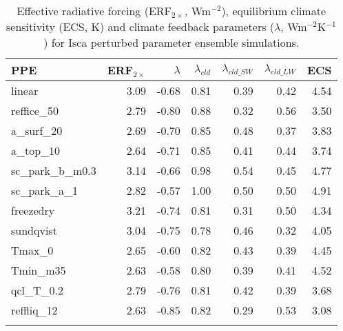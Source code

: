  \begin{table}[ht]
	\caption{Effective radiative forcing (ERF$_{2\times}$, Wm$^{-2}$), equilibrium climate sensitivity (ECS, K) and climate feedback parameters ($\lambda$, Wm$^{-2}$K$^{-1}$) for Isca perturbed parameter ensemble simulations.}
	\centering
	\small
	\vspace{2em}
	\renewcommand{\arraystretch}{1.2}
    \begin{tabular}{lrrrrrr}
    \toprule
    {PPE} &  ERF$_{2\times}$ &  $\lambda$ &  $\lambda_{cld}$ &  $\lambda_{cld\_SW}$ &  $\lambda_{cld\_LW}$ &  ECS \\
    \midrule
    linear         &    3.09 &   -0.68 &        0.81 &           0.39 &           0.42 & 4.54 \\
    reffice\_50     &    2.79 &   -0.80 &        0.88 &           0.32 &           0.56 & 3.50 \\
    a\_surf\_20      &    2.69 &   -0.70 &        0.85 &           0.48 &           0.37 & 3.83 \\
    a\_top\_10       &    2.64 &   -0.71 &        0.85 &           0.41 &           0.44 & 3.74 \\
    sc\_park\_b\_m0.3 &    3.14 &   -0.66 &        0.98 &           0.54 &           0.45 & 4.77 \\
    sc\_park\_a\_1    &    2.82 &   -0.57 &        1.00 &           0.50 &           0.50 & 4.91 \\
    freezedry      &    3.21 &   -0.74 &        0.81 &           0.31 &           0.50 & 4.34 \\
    sundqvist      &    3.04 &   -0.75 &        0.78 &           0.46 &           0.32 & 4.05 \\
    Tmax\_0         &    2.65 &   -0.60 &        0.82 &           0.43 &           0.39 & 4.45 \\
    Tmin\_m35       &    2.63 &   -0.58 &        0.80 &           0.39 &           0.41 & 4.52 \\
    qcl\_T\_0.2      &    2.79 &   -0.76 &        0.81 &           0.42 &           0.39 & 3.68 \\
    reffliq\_12     &    2.63 &   -0.85 &        0.82 &           0.29 &           0.53 & 3.08 \\
    \bottomrule
    \label{tab:ECS_forcing_feedback}
    \end{tabular}
\end{table}


